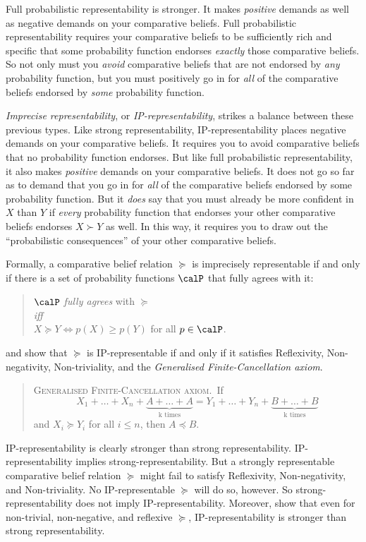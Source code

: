 Full probabilistic representability is stronger. It makes \textit{positive} demands as well as negative demands on your comparative beliefs. Full probabilistic representability requires your comparative beliefs to be sufficiently rich and specific that some probability function endorses \textit{exactly} those comparative beliefs. So not only must you \textit{avoid} comparative beliefs that are not endorsed by \textit{any} probability function, but you must positively go in for \textit{all} of the comparative beliefs endorsed by \textit{some} probability function.

\textit{Imprecise representability}, or \textit{IP-representability}, strikes a balance between these previous types. Like strong representability, IP-representability places negative demands on your comparative beliefs. It requires you to avoid comparative beliefs that no probability function endorses. But like full probabilistic representability, it also makes \textit{positive} demands on your comparative beliefs. It does not go so far as to demand that you go in for \textit{all} of the comparative beliefs endorsed by some probability function. But it \textit{does} say that you must already be more confident in $X$ than $Y$ if \textit{every} probability function that endorses your other comparative beliefs endorses $X\succ Y$ as well. In this way, it requires you to draw out the ``probabilistic consequences'' of your other comparative beliefs.

Formally, a comparative belief relation $\succeq$ is imprecisely representable if and only if there is a set of probability functions $\calP$ that fully agrees with it:
\begin{quote}\centering
$\calP$ \emph{fully agrees} with $\succeq$\\
\emph{iff}\\
$X\succeq Y \Leftrightarrow p(X)\geq p(Y)$ for all $p\in\calP$.
\end{quote}
\citet{Rios1992} and \citet{Alon2014} show that $\succeq$ is IP-representable if and only if it satisfies Reflexivity, Non-negativity, Non-triviality, and the \textit{Generalised Finite-Cancellation axiom}.
\begin{quote}
\textsc{Generalised Finite-Cancellation axiom}.\, If
$$
	X_1+\ldots+X_n+\underbrace{A+\hdots+A}_{\text{k times}} = Y_1+\ldots+Y_n+\underbrace{B+\hdots+B}_{\text{k times}}
$$
and $X_i\succeq Y_i$ for all $i\leq n$, then $A\preceq B$.
\end{quote}

IP-representability is clearly stronger than strong representability. IP-representability implies strong-representability. But a strongly representable comparative belief relation $\succeq$ might fail to satisfy Reflexivity, Non-negativity, and Non-triviality. No IP-representable $\succeq$ will do so, however. So strong-representability does not imply IP-representability. Moreover, \citet{Harrison-Trainor2016} show that even for non-trivial, non-negative, and reflexive $\succeq$, IP-representability is stronger than strong representability.

